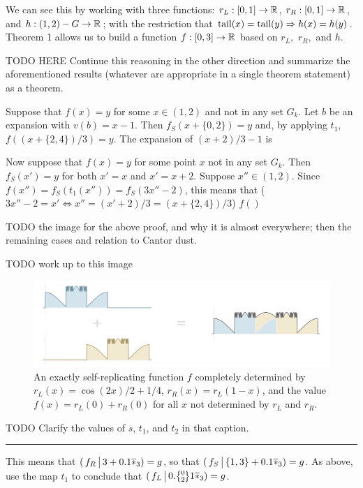 \documentclass[]{article}
\begin{document}
We can see this by working with three functions: \(r_L : [0,1] \to \mathbb{R}\),
\(r_R : [0,1] \to \mathbb{R}\), and \(h : (1,2) - G \to \mathbb{R}\); with the
restriction that \(\text{tail}(x) = \text{tail}(y) \Rightarrow h(x) = h(y)\).
Theorem 1 allows us to build a function \(f:[0,3]\to\mathbb{R}\) based on
\(r_L,\) \(r_R,\) and \(h.\)

TODO HERE Continue this reasoning in the other direction and summarize
the aforementioned results (whatever are appropriate in a single theorem
statement) as a theorem.

Suppose that \(f(x) = y\) for some \(x\in (1,2)\) and not in any set
\(G_k\). Let \(b\) be an expansion with \(v(b) = x-1\). Then
\(f_S(x+\{0,2\}) = y\) and, by applying \(t_1\),
\(f((x+\{2,4\})/3) = y\). The expansion of \((x+2)/3 - 1\) is

Now suppose that \(f(x) = y\) for some point \(x\) not in any set
\(G_k\). Then \(f_S(x') = y\) for both \(x' = x\) and \(x' = x + 2\).
Suppose \(x'' \in (1, 2)\). Since
\(f(x'') = f_S(t_1(x'')) = f_S(3x''-2)\), this means that
(\(3x''-2 = x' \Leftrightarrow x'' = (x'+2) / 3 = (x+\{2,4\})/3\))
\(f()\)

TODO the image for the above proof, and why it is almost everywhere;
then the remaining cases and relation to Cantor dust.

TODO work up to this image

\begin{figure}[htbp]
\centering
\includegraphics{images/pdfs/nonplateau.pdf}
\caption{\label{fig:nonplateau}An exactly self-replicating function
\(f\) completely determined by \(r_L(x) = \cos(2x)/2 + 1/4\),
\(r_R(x) = r_L(1 - x)\), and the value \(f(x) = r_L(0) + r_R(0)\) for
all \(x\) not determined by \(r_L\) and \(r_R\).}\label{fig:nonplateau}
\end{figure}

TODO Clarify the values of \(s\), \(t_1\), and \(t_2\) in that caption.

\begin{center}\rule{0.5\linewidth}{\linethickness}\end{center}

This means that \((\,f_R \,\big|\, 3 + 0.1\overline{*}_3) = g\), so that
\((\,f_S \,\big|\, \{1,3\} + 0.1\overline{*}_3) = g\). As above, use the map
\(t_1\) to conclude that \((\,f_L \restrict 0.\zerotwo 1\lstar) = g\).
\end{document}
